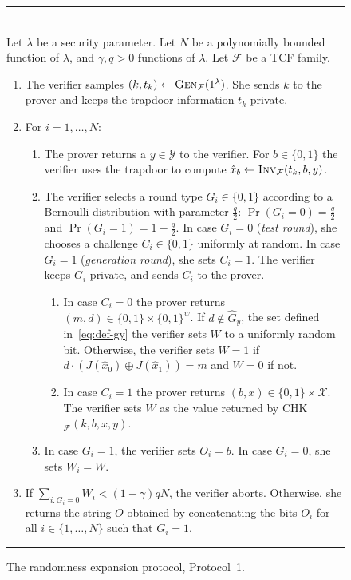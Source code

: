 \documentclass[11pt]{article}
\theoremstyle{remark}
\theoremstyle{definition}
\newcommand{\mF}{\ensuremath{\mathcal{F}}}
\newcommand{\mX}{\ensuremath{\mathcal{X}}}
\newcommand{\mY}{\ensuremath{\mathcal{Y}}}
\newcommand{\Inv}{\ensuremath{\textsc{Inv}}}
\newcommand{\dset}{G}
\newcommand{\Gen}{\textsc{Gen}}
\newcommand{\inj}{J}
\begin{document}
\begin{figure}[htbp]
\rule[1ex]{16.5cm}{0.5pt}\\
Let $\lambda$ be a security parameter. Let $N$ be a polynomially bounded function of $\lambda$, and $\gamma,q>0$ functions of $\lambda$. Let $\mF$ be a TCF family.
\begin{enumerate}
\item The verifier samples $(k,t_k)\leftarrow \Gen_\mF(1^\lambda)$. She sends $k$ to the prover and keeps the trapdoor information $t_k$ private. 
\item For $i=1,\ldots,N$:
\begin{enumerate}
\item The prover returns a  $y \in \mY$ to the verifier. For $b\in\{0,1\}$ the verifier uses the trapdoor to compute $\hat{x}_b\leftarrow \Inv_\mF(t_k,b,y)$. 
\item The verifier selects a round type $G_i \in \{0,1\}$ according to a Bernoulli  distribution with parameter $\frac{q}{2}$: $\Pr(G_i=0)=\frac{q}{2}$ and $\Pr(G_i=1)=1-\frac{q}{2}$. In case $G_i=0$ (\emph{test round}), she chooses a challenge $C_i\in \{0,1\}$ uniformly at random. In case $G_i=1$ (\emph{generation round}), she sets $C_i=1$. The verifier keeps $G_i$ private, and sends $C_i$ to the prover. 
\begin{enumerate}
\item In case $C_i=0$ the prover returns $(m,d)\in\{0,1\}\times \{0,1\}^w$. If $d\notin \hat{\dset}_y$, the set defined in~\eqref{eq:def-gy} the verifier sets $W$ to a uniformly random bit. Otherwise, the verifier sets $W=1$ if $d\cdot (\inj(\hat{x}_0)\oplus \inj(\hat{x}_1)) = m$ and $W=0$ if not.
\item In case $C_i=1$ the prover returns $(b,x)\in\{0,1\}\times \mX$. The verifier sets $W$ as the value returned by CHK$_{\mathcal{F}}(k,b,x,y)$. 
\end{enumerate}
\item In case $G_i=1$, the verifier sets $O_i = b$. In case $G_i=0$, she sets $W_i = W$. 
\end{enumerate}
\item If $\sum_{i: G_i=0} W_i < (1-\gamma)qN$, the verifier aborts. Otherwise, she returns the string $O$ obtained by concatenating the bits $O_i$ for all $i\in\{1,\ldots,N\}$ such that $G_i=1$. 
\end{enumerate}
\rule[1ex]{16.5cm}{0.5pt}
\caption{The randomness expansion protocol, Protocol~1.}
\label{fig:protocol}
\end{figure}
\end{document}

